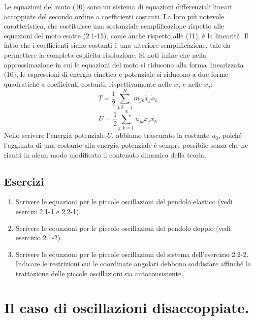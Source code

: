 \documentclass[11pt, a4paper]{book}
\numberwithin{equation}{section}
\newenvironment{esercizi}{\subsection*{Esercizi}\begin{enumerate}}{\end{enumerate}}
\begin{document}
Le equazioni del moto (10) sono un sistema di equazioni differenziali lineari accoppiate del secondo ordine a coefficienti costanti. La loro più notevole caratteristica, che costituisce una sostanziale semplificazione rispetto alle equazioni del moto esatte (2.1-15), come anche rispetto alle (11), è la linearità. Il fatto che i coefficienti siano costanti è una ulteriore semplificazione, tale da permettere la completa esplicita risoluzione. Si noti infine che nella approssimazione in cui le equazioni del moto si riducono alla forma linearizzata (10), le espressioni di energia cinetica e potenziale si riducono a due forme quadratiche a coefficienti costanti, rispettivamente nelle $\dot{x}_j$ e nelle $x_j$:
\begin{equation}
T = \frac{1}{2} \sum_{j,k=1}^{N} m_{jk} \dot{x}_j \dot{x}_k
\end{equation}
\begin{equation}
U = \frac{1}{2} \sum_{j,k=1}^{N} u_{jk} x_j x_k
\end{equation}
Nello scrivere l'energia potenziale $U$, abbiamo trascurato la costante $u_0$, poiché l'aggiunta di una costante alla energia potenziale è sempre possibile senza che ne risulti in alcun modo modificato il contenuto dinamico della teoria.

\begin{esercizi}
\item Scrivere le equazioni per le piccole oscillazioni del pendolo elastico (vedi esercizi 2.1-1 e 2.2-1).
\item Scrivere le equazioni per le piccole oscillazioni del pendolo doppio (vedi esercizio 2.1-2).
\item Scrivere le equazioni per le piccole oscillazioni del sistema dell'esercizio 2.2-2. Indicare le restrizioni cui le coordinate angolari debbono soddisfare affinché la trattazione delle piccole oscillazioni sia autoconsistente.
\end{esercizi}

\section{Il caso di oscillazioni disaccoppiate.}
\end{document}
